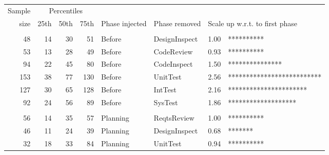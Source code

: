 \documentclass{sig-alternate}
\def\baselinestretch{1}
\begin{document}
 
\begin{figure}[!t] 
 \renewcommand{\baselinestretch}{0.7}
 \scriptsize
\begin{center}
\begin{tabular}{r|rrr|ll|rl}  %
  Sample&\multicolumn{3}{c|}{Percentiles}\\ 
size & 25th & 50th & 75th & Phase injected & Phase removed & \multicolumn{2}{l}{Scale up w.r.t. to first phase}\\\hline
\\
 48&   14&   30&   51&Before&DesignInspect &1.00 & **********  \\
 53&   13&   28&   49&Before&CodeReview &0.93 & **********  \\
 94&   22&   45&   80&Before&CodeInspect &1.50 & ***************  \\
153&   38&   77&  130&Before&UnitTest &2.56 & **************************  \\
127&   30&   65&  128&Before&IntTest &2.16 & **********************  \\
 92&   24&   56&   89&Before&SysTest &1.86 & *******************  \\
 
 
\\
 56&   14&   35&   57&Planning&ReqtsReview &1.00 & **********  \\
 46&   11&   24&   39&Planning&DesignInspect &0.68 & *******  \\
 32&   18&   33&   84&Planning&UnitTest &0.94 & **********  \\
 

\end{tabular}
\end{center}
\end{figure}
\end{document}
